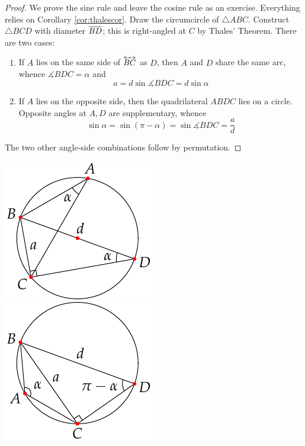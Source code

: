 \begin{minipage}[t]{0.72\linewidth}\vspace{0pt}
	\begin{proof}
		We prove the sine rule and leave the cosine rule as an exercise. Everything relies on Corollary \ref{cor:thalescor}. Draw the circumcircle of $\triangle ABC$. Construct $\triangle BCD$ with diameter $\overline{BD}$; this is right-angled at $C$ by Thales' Theorem. There are two cases:
		\begin{enumerate}
		  \item If $A$ lies on the same side of $\overleftrightarrow{BC}$ as $D$, then $A$ and $D$ share the same arc, whence $\measuredangle BDC=\alpha$ and
		  \[
		  	a=d\sin\measuredangle BDC=d\sin\alpha
		  \]
		  \item If $A$ lies on the opposite side, then the quadrilateral $ABDC$ lies on a circle. Opposite angles at $A,D$ are supplementary, whence
			\[
				\sin\alpha=\sin(\pi-\alpha)=\sin\measuredangle BDC=\frac ad
			\]
		\end{enumerate}
		The two other angle-side combinations follow by permutation.\phantom{\qedhere}
	\end{proof}
\end{minipage}
\hfill
\begin{minipage}[t]{0.25\linewidth}\vspace{-5pt}
	\flushright\includegraphics[scale=0.95]{angles-sinerule}\smallbreak
	\includegraphics[scale=0.95]{angles-sinerule2}\\[-20pt]
	\hfill\qedsymbol
\end{minipage}


